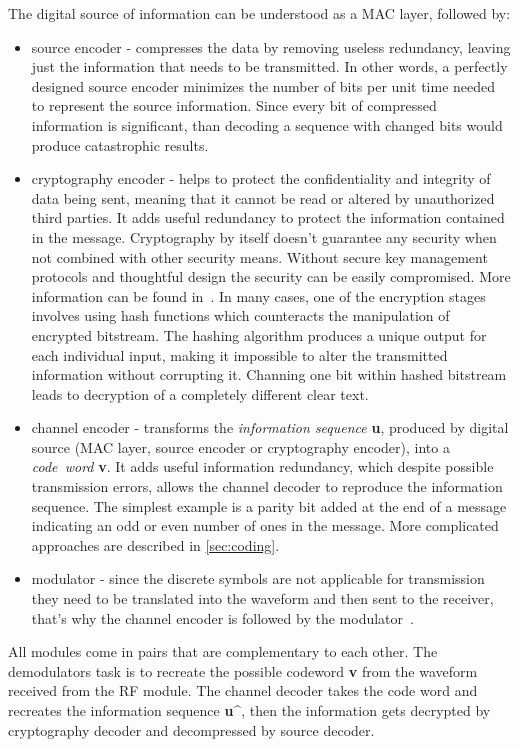 The digital source of information can be understood as a MAC layer, followed by:
\begin{itemize}
    \item source encoder - compresses the data by removing useless redundancy, leaving just the information that needs to be transmitted. In other words, a perfectly designed source encoder minimizes the number of bits per unit time needed to represent the source information. Since every bit of compressed information is significant, than decoding a sequence with changed bits would produce catastrophic results.
    \item cryptography encoder - helps to protect the confidentiality and integrity of data being sent, meaning that it cannot be read or altered by unauthorized third parties. It adds useful redundancy to protect the information contained in the message. Cryptography by itself doesn't guarantee any security when not combined with other security means. Without secure key management protocols and thoughtful design the security can be easily compromised. More information can be found in~\cite{Cryptography}. In many cases, one of the encryption stages involves using hash functions which counteracts the manipulation of encrypted bitstream. The hashing algorithm produces a unique output for each individual input, making it impossible to alter the transmitted information without corrupting it. Channing one bit within hashed bitstream leads to decryption of a completely different clear text.
    \item channel encoder - transforms the \textit{information sequence} \textbf{u}, produced by digital source (MAC layer, source encoder or cryptography encoder), into a \textit{code~word} \textbf{v}. It adds useful information redundancy, which despite possible transmission errors, allows the channel decoder to reproduce the information sequence. The simplest example is a parity bit added at the end of a message indicating an odd or even number of ones in the message. More complicated approaches are described in \autoref{sec:coding}.
    \item modulator - since the discrete symbols are not applicable for transmission they need to be translated into the waveform and then sent to the receiver, that's why the channel encoder is followed by the modulator~\cite{book:LinCostello}.
\end{itemize}
All modules come in pairs that are complementary to each other. The demodulators task is to recreate the possible codeword \textbf{v} from the waveform received from the RF module. The channel decoder takes the code word and recreates the information sequence \textbf{u\^}, then the information gets decrypted by cryptography decoder and decompressed by source decoder.



